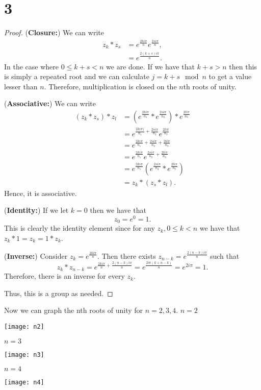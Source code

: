 \documentclass{article}
\begin{document}
\section*{3}
\begin{proof}

    (\textbf{Closure:})
    We can write
    \begin{align*}
        z_k * z_s & = e^{\frac{2ki\pi}{n}}e^{\frac{2si\pi}{n}}, \\
                  & = e^{\frac{2(k + s)i\pi}{n}}.
    \end{align*}
    In the case where $0 \leq k + s < n$ we are done. If we have that
    $k + s > n$ then this is simply a repeated root and we can calculate
    $j = k + s \mod n$ to get a value lesser than $n$. Therefore,
    multiplication is closed on the $n$th roots of unity.

    (\textbf{Associative:}) We can write
    \begin{align*}
        (z_k * z_s) * z_l & = (e^{\frac{2ki\pi }{n_1}} * e^{\frac{2si\pi }{n_2}})
        *e^{\frac{2li\pi }{n_3}}                                                                          \\
                          & = e^{\frac{2ki\pi)}{n_1} + \frac{2si\pi}{n_2}} e^{\frac{2li\pi }{n_3}}        \\
                          & = e^{\frac{2ki\pi}{n_1}+\frac{2si\pi}{n_2}+\frac{2li\pi}{n_3}}                \\
                          & =e^{\frac{2ki\pi }{n_1}} e^{\frac{2si\pi}{n_2} + \frac{2li\pi}{n_3}}          \\
                          & = e^{\frac{2ki\pi }{n_1}} (e^{\frac{2si\pi }{n_2}} * e^{\frac{2li\pi }{n_3}}) \\
                          & = z_k*(z_s*z_l).
    \end{align*}
    Hence, it is associative.

    (\textbf{Identity:}) If we let $k = 0$ then we have that
    \begin{equation*}
        z_0 = e^0 = 1.
    \end{equation*}
    This is clearly the identity element since for any $z_k, 0 \leq k < n$ we have that
    $z_k * 1 = z_k = 1 * z_k$.

    (\textbf{Inverse:}) Consider $z_k = e^{\frac{2ki\pi }{n}}$. Then there exists
    $z_{n-k} = e^{\frac{2(n-k)i \pi }{n}}$ such that
    \begin{equation*}
        z_k*z_{n-k} = e^{\frac{2ki\pi }{n} + \frac{2(n-k)i\pi }{n}}
        = e^{\frac{2i\pi(k + n - k)}{n}} = e^{2i\pi} = 1.
    \end{equation*}
    Therefore, there is an inverse for every $z_k$.

    Thus, this is a group as needed.
\end{proof}

Now we can graph the nth roots of unity for $n = 2,3,4$.
$n=2$

\texttt{[image: n2]}

$n=3$

\texttt{[image: n3]}

$n=4$

\texttt{[image: n4]}
\end{document}
